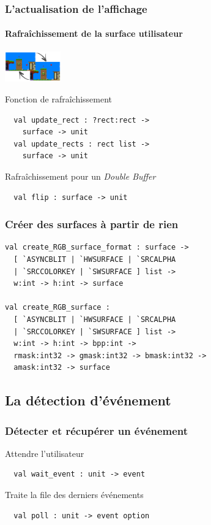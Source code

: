 \begin{frame}[fragile]
	\frametitle{L'actualisation de l'affichage}
	\framesubtitle{Rafraîchissement de la surface utilisateur}
	\begin{center}
		\includegraphics[width=2.4cm]{pics/doubleBufferScreen.png}
	\end{center}
	\begin{block}{Fonction de rafraîchissement}
		\begin{lstlisting}
  val update_rect : ?rect:rect -> 
    surface -> unit
  val update_rects : rect list -> 
    surface -> unit
		\end{lstlisting}
	\end{block}
	\begin{block}{Rafraîchissement pour un \textit{Double Buffer}}
		\begin{lstlisting}
  val flip : surface -> unit
		\end{lstlisting}
	\end{block}
\end{frame}

\begin{frame}[fragile]
	\frametitle{Créer des surfaces à partir de rien}
	\lstset{basicstyle=\footnotesize}
	\begin{lstlisting}
val create_RGB_surface_format : surface ->
  [ `ASYNCBLIT | `HWSURFACE | `SRCALPHA 
  | `SRCCOLORKEY | `SWSURFACE ] list ->
  w:int -> h:int -> surface

val create_RGB_surface : 
  [ `ASYNCBLIT | `HWSURFACE | `SRCALPHA 
  | `SRCCOLORKEY | `SWSURFACE ] list ->
  w:int -> h:int -> bpp:int ->
  rmask:int32 -> gmask:int32 -> bmask:int32 ->
  amask:int32 -> surface
	\end{lstlisting}
\end{frame}

\subsection{La détection d'événement} %
\begin{frame}[fragile]
	\frametitle{Détecter et récupérer un événement}
	\begin{block}{Attendre l'utilisateur}
		\begin{lstlisting}
  val wait_event : unit -> event
		\end{lstlisting}
	\end{block}
	\begin{block}{Traite la file des derniers événements}
		\begin{lstlisting}
  val poll : unit -> event option
		\end{lstlisting}
	\end{block}
\end{frame}

